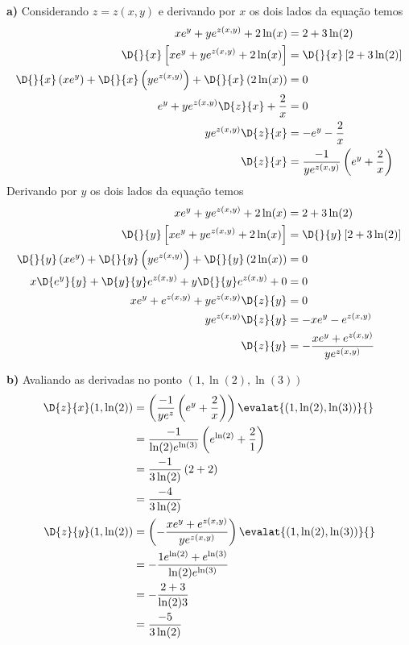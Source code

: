 \documentclass[a4paper,12pt,fleqn]{article}
\begin{document}
\begin{answer}
\vspace{\baselineskip}
\textbf{a)\;}
Considerando $z=z(x, y)$ e derivando por $x$ os dois lados da equação temos
\begin{align*}
  xe^y + ye^{z(x, y)} + 2\ln(x) & = 2 +3\ln(2)  \\
  \D{}{x}\left[xe^y + ye^{z(x, y)} + 2\ln(x)\right] & = \D{}{x}\left[2 +3\ln(2)\right] \\
  \D{}{x}\left(xe^y\right) +
  \D{}{x}\left(ye^{z(x, y)}\right) +
  \D{}{x}\left(2\ln(x)\right)      & = 0 \\
  e^y + ye^{z(x, y)}\D{z}{x} + \frac{2}{x} & = 0 \\
  ye^{z(x, y)}\D{z}{x} & = -e^y - \frac{2}{x}  \\
  \D{z}{x}     & = \frac{-1}{ye^{z(x, y)}}\left(e^y + \frac{2}{x}\right)
\end{align*}
Derivando por $y$ os dois lados da equação temos
\begin{align*}
  xe^y + ye^{z(x, y)} + 2\ln(x) & = 2 +3\ln(2) \\
  \D{}{y}\left[xe^y + ye^{z(x, y)} + 2\ln(x)\right] & = \D{}{y}\left[2 +3\ln(2)\right] \\
  \D{}{y}\left(xe^y\right) +
  \D{}{y}\left(ye^{z(x, y)}\right) +
  \D{}{y}\left(2\ln(x)\right) & = 0 \\
  x\D{e^y}{y} + \D{y}{y}e^{z(x, y)} + y\D{}{y}e^{z(x, y)} + 0 & = 0 \\
  xe^y + e^{z(x, y)} + ye^{z(x, y)}\D{z}{y} & = 0 \\
  ye^{z(x, y)}\D{z}{y} & = -xe^y - e^{z(x, y)} \\
  \D{z}{y} & = - \frac{xe^y + e^{z(x, y)}}{ye^{z(x, y)}}
\end{align*}

\vspace{\baselineskip}
\textbf{b)\;}
Avaliando as derivadas no ponto \((1, \ln(2), \ln(3))\)
\begin{align*}
  \D{z}{x}(1, \ln(2))
  & = \left(\frac{-1}{ye^z}\left(e^y + \frac{2}{x}\right)\right)\evalat{(1, \ln(2), \ln(3))}{} \\
  & = \frac{-1}{\ln(2)e^{\ln(3)}}\left(e^{\ln(2)} + \frac{2}{1}\right) \\
  & = \frac{-1}{3\ln(2)}\left(2 + 2\right) \\
  & = \frac{-4}{3\ln(2)} \\
  \D{z}{y}(1, \ln(2))
  & = \left(- \frac{xe^y + e^{z(x, y)}}{ye^{z(x, y)}}\right)\evalat{(1, \ln(2), \ln(3))}{} \\
  & = - \frac{1e^{\ln(2)} + e^{\ln(3)}}{{\ln(2)}e^{\ln(3)}} \\
  & = - \frac{2 + 3}{{\ln(2)}3} \\
  & = \frac{-5}{3\ln(2)}
  \end{align*}


\end{answer}
\end{document}
